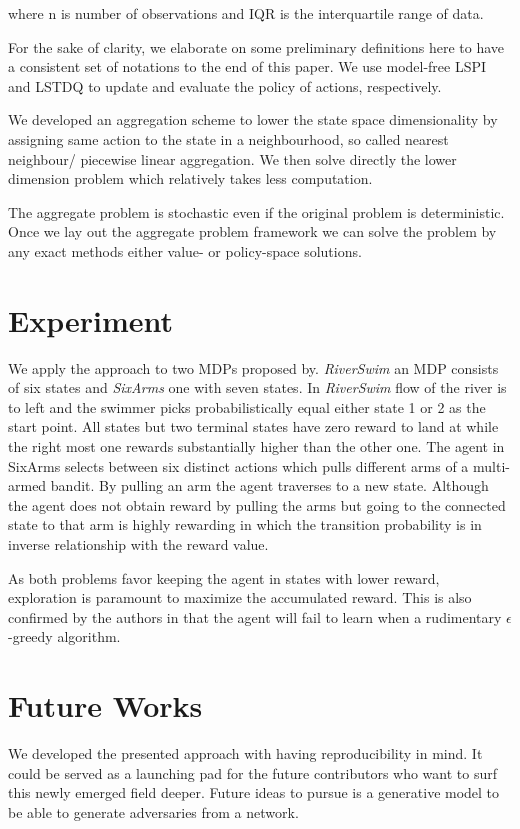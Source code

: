 \documentclass{article}
\begin{document}
    where n is number of observations and IQR is the interquartile range of data.

    For the sake of clarity, we elaborate on some preliminary definitions here to have a consistent set of notations
    to the end of this paper. We use model-free LSPI and LSTDQ \citep{Lagoudakis2003} to update and
    evaluate the policy of actions, respectively.

    We developed an aggregation scheme to lower the state space dimensionality by assigning same action to the state
    in a neighbourhood, so called nearest neighbour/ piecewise linear aggregation.
    We then solve directly the lower dimension problem which relatively takes less computation.

    The aggregate problem is stochastic even if the original problem is deterministic.
    Once we lay out the aggregate problem framework we can solve the problem by any exact methods either value- or
    policy-space solutions.


    \section{Experiment}
    We apply the approach to two MDPs proposed by\cite{Strehl2004}. \textit{RiverSwim} an MDP consists of six states and \textit{SixArms} one with seven states. In \textit{RiverSwim} flow of the river is to left and the swimmer picks probabilistically equal either state 1 or 2 as the start point. All states but two terminal states have zero reward to land at while the right most one rewards substantially higher than the other one. The agent in SixArms selects between six distinct actions which pulls different arms of a multi-armed bandit. By pulling an arm the agent traverses to a new state. Although the agent does not obtain reward by pulling the arms but going to the connected state to that arm is highly rewarding in which the transition probability is in inverse relationship with the reward value.

    As both problems favor keeping the agent in states with lower reward, exploration is paramount to maximize the accumulated reward. This is also confirmed by the authors in \cite{Strehl2004} that the agent will fail to learn when a rudimentary $\epsilon$-greedy algorithm.


    \section{Future Works}
    We developed the presented approach with having reproducibility in mind. It could be served as a launching pad for the future contributors who want to surf this newly emerged field deeper. Future ideas to pursue is a generative model to be able to generate adversaries from a network.
\end{document}
